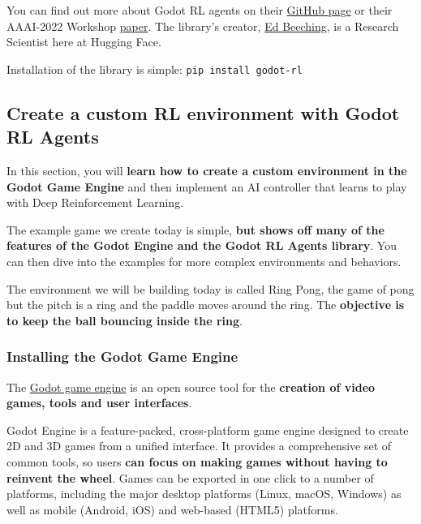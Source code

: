 \documentclass[11pt,a4paper]{article}
\begin{document}
You can find out more about Godot RL agents on their \href{https://github.com/edbeeching/godot_rl_agents}{GitHub page} or their AAAI-2022 Workshop \href{https://arxiv.org/abs/2112.03636}{paper}. The library's creator, \href{https://edbeeching.github.io/}{Ed Beeching}, is a Research Scientist here at Hugging Face.

Installation of the library is simple: \texttt{pip\ install\ godot-rl}

\subsection{Create a custom RL environment with Godot RL Agents}\label{create-a-custom-rl-environment-with-godot-rl-agents}

In this section, you will \textbf{learn how to create a custom environment in the Godot Game Engine} and then implement an AI controller that learns to play with Deep Reinforcement Learning.

The example game we create today is simple, \textbf{but shows off many of the features of the Godot Engine and the Godot RL Agents library}. You can then dive into the examples for more complex environments and behaviors.

The environment we will be building today is called Ring Pong, the game of pong but the pitch is a ring and the paddle moves around the ring. The \textbf{objective is to keep the ball bouncing inside the ring}.


\subsubsection{Installing the Godot Game Engine}\label{installing-the-godot-game-engine}

The \href{https://godotengine.org/}{Godot game engine} is an open source tool for the \textbf{creation of video games, tools and user interfaces}.

Godot Engine is a feature-packed, cross-platform game engine designed to create 2D and 3D games from a unified interface. It provides a comprehensive set of common tools, so users \textbf{can focus on making games without having to reinvent the wheel}. Games can be exported in one click to a number of platforms, including the major desktop platforms (Linux, macOS, Windows) as well as mobile (Android, iOS) and web-based (HTML5) platforms.
\end{document}
